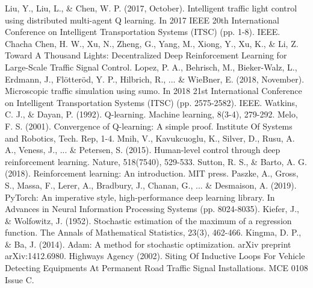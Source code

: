 \documentclass[conference]{IEEEtran}
\begin{document}
\begin{thebibliography}{1}
 Liu, Y., Liu, L., \& Chen, W. P. (2017, October). Intelligent traffic light control using distributed multi-agent Q learning. In 2017 IEEE 20th International Conference on Intelligent Transportation Systems (ITSC) (pp. 1-8). IEEE.
 Chacha Chen, H. W., Xu, N., Zheng, G., Yang, M., Xiong, Y., Xu, K., \& Li, Z. Toward A Thousand Lights: Decentralized Deep Reinforcement Learning for Large-Scale Traffic Signal Control.
 Lopez, P. A., Behrisch, M., Bieker-Walz, L., Erdmann, J., Flötteröd, Y. P., Hilbrich, R., ... \& WieBner, E. (2018, November). Microscopic traffic simulation using sumo. In 2018 21st International Conference on Intelligent Transportation Systems (ITSC) (pp. 2575-2582). IEEE.
 Watkins, C. J., \& Dayan, P. (1992). Q-learning. Machine learning, 8(3-4), 279-292.
 Melo, F. S. (2001). Convergence of Q-learning: A simple proof. Institute Of Systems and Robotics, Tech. Rep, 1-4.
 Mnih, V., Kavukcuoglu, K., Silver, D., Rusu, A. A., Veness, J.,  ... \& Petersen, S. (2015). Human-level control through deep reinforcement learning. Nature, 518(7540), 529-533.
 Sutton, R. S., \& Barto, A. G. (2018). Reinforcement learning: An introduction. MIT press.
 Paszke, A., Gross, S., Massa, F., Lerer, A., Bradbury, J., Chanan, G., ... \& Desmaison, A. (2019). PyTorch: An imperative style, high-performance deep learning library. In Advances in Neural Information Processing Systems (pp. 8024-8035).
 Kiefer, J., \& Wolfowitz, J. (1952). Stochastic estimation of the maximum of a regression function. The Annals of Mathematical Statistics, 23(3), 462-466.
 Kingma, D. P., \& Ba, J. (2014). Adam: A method for stochastic optimization. arXiv preprint arXiv:1412.6980.
 Highways Agency (2002). Siting Of Inductive Loops For Vehicle Detecting Equipments At Permanent Road Traffic Signal Installations. MCE 0108 Issue C.
\end{thebibliography}


\end{document}
